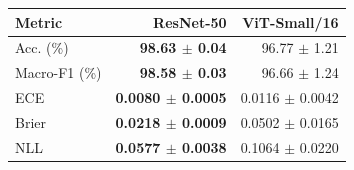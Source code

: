 \begin{tabular}{lrr}
\toprule
Metric & ResNet-50 & ViT-Small/16 \\
\midrule
Acc. (\%) & \textbf{98.63 $\pm$ 0.04} & 96.77 $\pm$ 1.21 \\
Macro-F1 (\%) & \textbf{98.58 $\pm$ 0.03} & 96.66 $\pm$ 1.24 \\
ECE & \textbf{0.0080 $\pm$ 0.0005} & 0.0116 $\pm$ 0.0042 \\
Brier & \textbf{0.0218 $\pm$ 0.0009} & 0.0502 $\pm$ 0.0165 \\
NLL & \textbf{0.0577 $\pm$ 0.0038} & 0.1064 $\pm$ 0.0220 \\
\bottomrule
\end{tabular}
